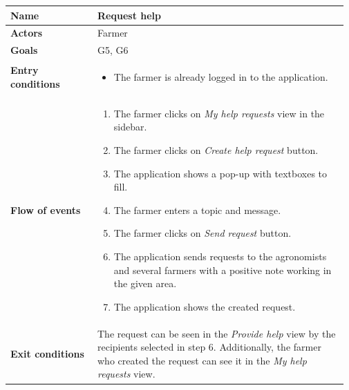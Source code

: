 \begin{longtable}{@{}p{0.25\linewidth} p{0.72\linewidth}@{}}
\toprule
	\textbf{Name}               & Request help\\
	\midrule
	\textbf{Actors}             & Farmer\\
	\midrule
	\textbf{Goals}              & G5, G6 \\
	\midrule
	
	\textbf{Entry conditions}   & \begin{itemize}[leftmargin=.4cm,noitemsep,topsep=0pt,before=\vspace{-3mm},after=\vspace{-4mm}]
	    \item The farmer is already logged in to the application.
	\end{itemize}\\
	\midrule
	
	\textbf{Flow of events}     & \begin{enumerate}[leftmargin=.4cm,noitemsep,topsep=0pt,before=\vspace{-3mm},after=\vspace{-4mm}]
	    \item The farmer clicks on \textit{My help requests} view in the sidebar.
	    \item The farmer clicks on \textit{Create help request} button.
	    \item The application shows a pop-up with textboxes to fill.
	    \item The farmer enters a topic and message.
	    \item The farmer clicks on \textit{Send request} button.
	    \item The application sends requests to the agronomists and several farmers with a positive note working in the given area. 
	    \item The application shows the created request.
	\end{enumerate}\\
	\midrule
	\textbf{Exit conditions}    & The request can be seen in the \textit{Provide help} view by the recipients selected in step 6. Additionally, the farmer who created the request can see it in the \textit{My help requests} view. \\
	\midrule
	

\end{longtable}
